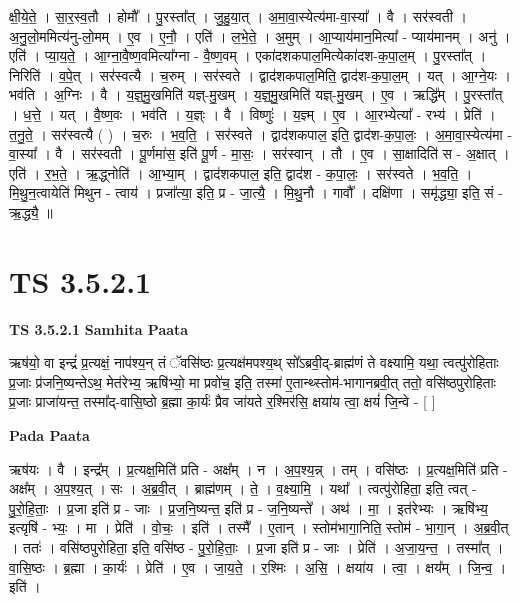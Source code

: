 \documentclass[17pt]{extarticle}
\begin{document}
क्षी॒ये॒ते॒ । सा॒र॒स्व॒तौ । होमौ᳚ । पु॒रस्ता᳚त् । जु॒हु॒या॒त् । अ॒मा॒वा॒स्येत्य॑मा-वा॒स्या᳚ । वै । सर॑स्वती । अ॒नु॒लो॒ममित्य॑नु-लो॒मम् । ए॒व । ए॒नौ॒ । एति॑ । ल॒भे॒ते॒ । अ॒मुम् । आ॒प्याय॑मान॒मित्या᳚ - प्याय॑मानम् । अनु॑ । एति॑ । प्या॒य॒ते॒ । आ॒ग्ना॒वै॒ष्ण॒वमित्या᳚ग्ना - वै॒ष्ण॒वम् । एका॑दशकपाल॒मित्येका॑दश-क॒पा॒ल॒म् । पु॒रस्ता᳚त् । निरिति॑ । व॒पे॒त् । सर॑स्वत्यै । च॒रुम् । सर॑स्वते । द्वाद॑शकपाल॒मिति॒ द्वाद॑श-क॒पा॒ल॒म् । यत् । आ॒ग्ने॒यः । भव॑ति । अ॒ग्निः । वै । य॒ज्ञ्॒मु॒खमिति॑ यज्ञ्-मु॒खम् । य॒ज्ञ्॒मु॒खमिति॑ यज्ञ्-मु॒खम् । ए॒व । ऋद्धि᳚म् । पु॒रस्ता᳚त् । ध॒त्ते॒ । यत् । वै॒ष्ण॒वः । भव॑ति । य॒ज्ञ्ः । वै । विष्णुः॑ । य॒ज्ञ्म् । ए॒व । आ॒रभ्येत्या᳚ - रभ्य॑ । प्रेति॑ । त॒नु॒ते॒ । सर॑स्वत्यै ( ) । च॒रुः । भ॒व॒ति॒ । सर॑स्वते । द्वाद॑शकपाल॒ इति॒ द्वाद॑श-क॒पा॒लः॒ । अ॒मा॒वा॒स्येत्य॑मा - वा॒स्या᳚ । वै । सर॑स्वती । पू॒र्णमा॑स॒ इति॑ पू॒र्ण - मा॒सः॒ । सर॑स्वान् । तौ । ए॒व । सा॒क्षादिति॑ स - अ॒क्षात् । एति॑ । र॒भ॒ते॒ । ऋ॒द्ध्नोति॑ । आ॒भ्या॒म् । द्वाद॑शकपाल॒ इति॒ द्वाद॑श - क॒पा॒लः॒ । सर॑स्वते । भ॒व॒ति॒ । मि॒थु॒न॒त्वायेति॑ मिथुन - त्वाय॑ । प्रजा᳚त्या॒ इति॒ प्र - जा॒त्यै॒ । मि॒थु॒नौ । गावौ᳚ । दक्षि॑णा । समृ॑द्ध्या॒ इति॒ सं - ऋ॒द्ध्यै॒ ॥  \newline




\section*{ TS 3.5.2.1 }

\textbf{TS 3.5.2.1 } \newline
\textbf{Samhita Paata} \newline

ऋष॑यो॒ वा इन्द्रं॑ प्र॒त्यक्षं॒ नाप॑श्य॒न् तं ॅवसि॑ष्ठः प्र॒त्यक्ष॑मपश्य॒थ् सो᳚ऽब्रवी॒द्-ब्राह्म॑णं ते वक्ष्यामि॒ यथा॒ त्वत्पु॑रोहिताः प्र॒जाः प्र॑जनि॒ष्यन्तेऽथ॒ मेत॑रेभ्य॒ ऋषि॑भ्यो॒ मा प्रवो॑च॒ इति॒ तस्मा॑ ए॒तान्थ्स्तोम॑-भागानब्रवी॒त् ततो॒ वसि॑ष्ठपुरोहिताः प्र॒जाः प्राजा॑यन्त॒ तस्मा᳚द्-वासि॒ष्ठो ब्र॒ह्मा का॒र्यः॑ प्रैव जा॑यते र॒श्मिर॑सि॒ क्षया॑य त्वा॒ क्षयं॑ जि॒न्वे - [  ] \newline

\textbf{Pada Paata} \newline

ऋष॑यः । वै । इन्द्र᳚म् । प्र॒त्यक्ष॒मिति॑ प्रति - अक्ष᳚म् । न । अ॒प॒श्य॒न्न् । तम् । वसि॑ष्ठः । प्र॒त्यक्ष॒मिति॑ प्रति - अक्ष᳚म् । अ॒प॒श्य॒त् । सः । अ॒ब्र॒वी॒त् । ब्राह्म॑णम् । ते॒ । व॒क्ष्या॒मि॒ । यथा᳚ । त्वत्पु॑रोहिता॒ इति॒ त्वत् - पु॒रो॒हि॒ताः॒ । प्र॒जा इति॑ प्र - जाः । प्र॒ज॒नि॒ष्यन्त॒ इति॑ प्र - ज॒नि॒ष्यन्ते᳚ । अथ॑ । मा॒ । इत॑रेभ्यः । ऋषि॑भ्य॒ इत्यृषि॑ - भ्यः॒ । मा । प्रेति॑ । वो॒चः॒ । इति॑ । तस्मै᳚ । ए॒तान् । स्तोम॑भागा॒निति॒ स्तोम॑ - भा॒गा॒न् । अ॒ब्र॒वी॒त् । ततः॑ । वसि॑ष्ठपुरोहिता॒ इति॒ वसि॑ष्ठ - पु॒रो॒हि॒ताः॒ । प्र॒जा इति॑ प्र - जाः । प्रेति॑ । अ॒जा॒य॒न्त॒ । तस्मा᳚त् । वा॒सि॒ष्ठः । ब्र॒ह्मा । का॒र्यः॑ । प्रेति॑ । ए॒व । जा॒य॒ते॒ । र॒श्मिः । अ॒सि॒ । क्षया॑य । त्वा॒ । क्षय᳚म् । जि॒न्व॒ । इति॑ ।  \newline
\end{document}
